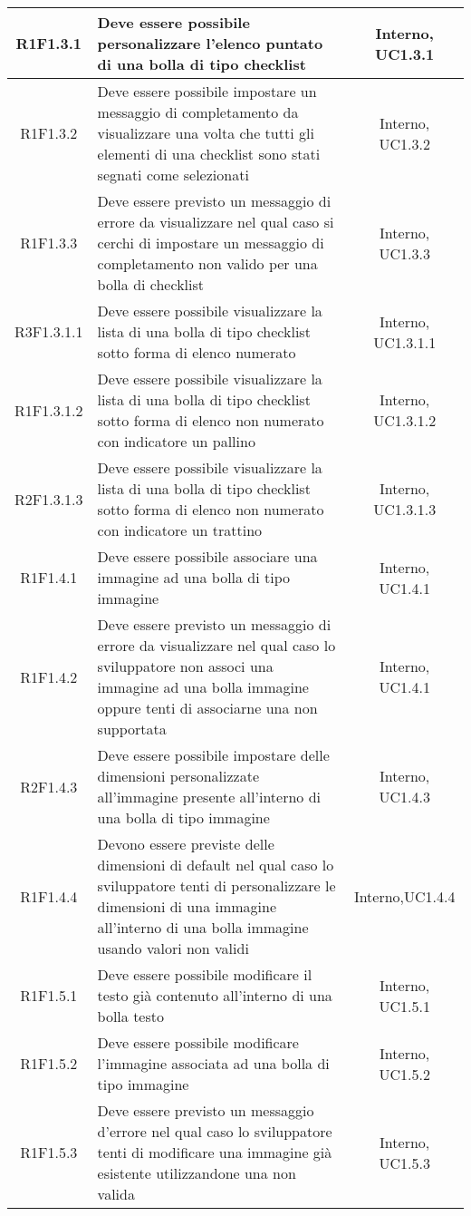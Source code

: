\begin{longtable}{|c|>{\centering}m{7cm}|c|}
		\hline
		R1F1.3.1 & Deve essere possibile personalizzare l'elenco puntato di una bolla di tipo checklist & Interno, UC1.3.1 \\
		\hline
		R1F1.3.2 & Deve essere possibile impostare un messaggio di completamento da visualizzare una volta che tutti gli elementi di una checklist sono stati segnati come selezionati & Interno, UC1.3.2 \\
		\hline
		R1F1.3.3 & Deve essere previsto un messaggio di errore da visualizzare nel qual caso si cerchi di impostare un messaggio di completamento non valido per una bolla di checklist & Interno, UC1.3.3 \\
		\hline	
		R3F1.3.1.1 & Deve essere possibile visualizzare la lista di una bolla di tipo checklist sotto forma di elenco numerato & Interno, UC1.3.1.1 \\
		\hline
		R1F1.3.1.2 & Deve essere possibile visualizzare la lista di una bolla di tipo checklist sotto forma di elenco non numerato con indicatore un pallino & Interno, UC1.3.1.2 \\
		\hline
		R2F1.3.1.3 & Deve essere possibile visualizzare la lista di una bolla di tipo checklist sotto forma di elenco non numerato con indicatore un trattino & Interno, UC1.3.1.3 \\
		\hline
		R1F1.4.1 & Deve essere possibile associare una immagine ad una bolla di tipo immagine & Interno, UC1.4.1 \\
		\hline
		R1F1.4.2 & Deve essere previsto un messaggio di errore da visualizzare nel qual caso lo sviluppatore non associ una immagine ad una bolla immagine oppure tenti di associarne una non supportata & Interno, UC1.4.1 \\
		\hline
		R2F1.4.3 & Deve essere possibile impostare delle dimensioni personalizzate all'immagine presente all'interno di una bolla di tipo immagine & Interno, UC1.4.3 \\
		\hline
		R1F1.4.4 & Devono essere previste delle dimensioni di default nel qual caso lo sviluppatore tenti di personalizzare le dimensioni di una immagine all'interno di una bolla immagine usando valori non validi & Interno,UC1.4.4 \\
			\hline
		R1F1.5.1 & Deve essere possibile modificare il testo già contenuto all'interno di una bolla testo & Interno, UC1.5.1 \\
		\hline
		R1F1.5.2 & Deve essere possibile modificare l'immagine associata ad una bolla di tipo immagine & Interno, UC1.5.2 \\
		\hline
		R1F1.5.3 & Deve essere previsto un messaggio d'errore nel qual caso lo sviluppatore tenti di modificare una immagine già esistente utilizzandone una non valida & Interno, UC1.5.3 \\

\end{longtable}
